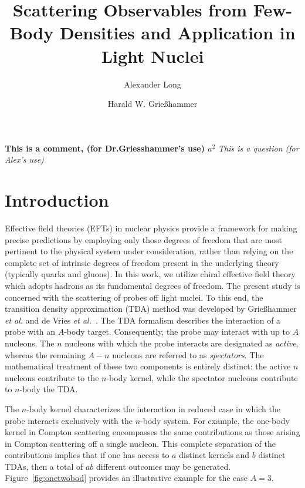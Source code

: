\documentclass[a4paper,11pt]{article}
\title{Scattering Observables from Few-Body Densities and Application
in Light Nuclei}
\author*{Alexander Long}
\author{Harald W. Grie{\ss}hammer}
\affiliation{Institute for Nuclear Studies, Department of
Physics,\\The George Washington University}
\newcommand{\ques}[1]{\color{red}\textit{ #1 }\color{black}}
\newcommand{\com}[1]{\color{blue}\small\textbf{ #1 }\color{black}\normalsize}
\begin{document}
\maketitle
\com{This is a comment, (for Dr.Griesshammer's use) $a^2$}
\ques{This is a question (for Alex's use)}
\section{Introduction}
Effective field theories (EFTs) in nuclear physics provide a
framework for making precise predictions by employing only those
degrees of freedom that are most pertinent to the physical system
under consideration, rather than relying on the complete set of
intrinsic degrees of freedom present in the underlying theory
(typically quarks and gluons). In this work, we utilize chiral
effective field theory which adopts hadrons
as its fundamental degrees of freedom.
The present study is concerned with the scattering of probes off
light nuclei. To this end, the transition density approximation (TDA)
method was developed by Grie\ss hammer \textit{et al.} and de Vries
\textit{et al.}~\cite{hammer2020, Vries2024}. The TDA formalism
describes the interaction of a probe with an $A$-body target.
Consequently, the probe may interact with up to $A$ nucleons. The $n$ nucleons with which the probe
interacts are designated as \textit{active}, whereas the remaining
$A-n$ nucleons are referred to as \textit{spectators}. The
mathematical treatment of these two components is entirely distinct:
the active $n$ nucleons contribute to the $n$-body kernel, while the
spectator nucleons contribute to $n$-body the TDA.

The $n$-body kernel characterizes the interaction in reduced case
in which the probe interacts exclusively with the $n$-body
system. For example, the one-body kernel in Compton scattering
encompasses the same contributions as those arising in Compton
scattering off a single nucleon. This complete separation of the
contributions implies that if one has access to $a$ distinct kernels
and $b$ distinct TDAs, then a total of $ab$ different outcomes may be
generated. Figure~\ref{fig:onetwobod} provides an illustrative
example for the case $A=3$.
\end{document}
